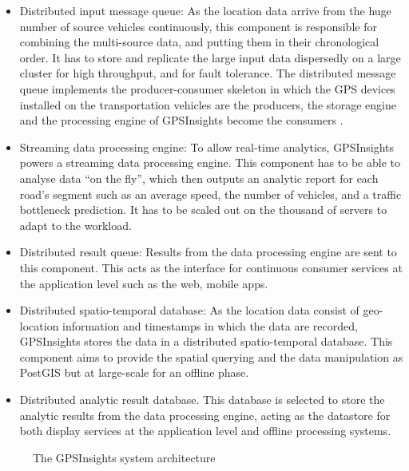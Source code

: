 \documentclass{sig-alternate-05-2015}
\begin{document}
\begin{itemize}
\item 	Distributed input message queue: As the location data arrive from the huge number of source vehicles continuously, this component is responsible for combining the multi-source data, and putting them in their chronological order. It has to store and replicate the large input data dispersedly on a large cluster for high throughput, and for fault tolerance. The distributed message queue implements the producer-consumer skeleton in which the GPS devices installed on the transportation vehicles are the producers, the storage engine and the processing engine of GPSInsights become the consumers	.

\item  Streaming data processing engine: To allow real-time analytics, GPSInsights powers a streaming data processing engine. This component has to be able to analyse data ``on the fly'', which then outputs an analytic report for each road's segment such as an average speed, the number of vehicles, and a traffic bottleneck prediction. It has to be scaled out on the thousand of servers to adapt to the workload.

\item  Distributed result queue: Results from the data processing engine are sent to this component. This acts as the interface for continuous consumer services at the application level such as the web, mobile apps. 

\item  Distributed spatio-temporal database: As the location data consist of geo-location information and timestamps in which the data are recorded, GPSInsights stores the data in a distributed spatio-temporal database. This component aims to provide the spatial querying and the data manipulation as PostGIS but at large-scale for an offline phase. 

\item  Distributed analytic result database. This database is selected to store the analytic results from the data processing engine, acting as the datastore for both display services at the application level and offline processing systems. 

\end{itemize}

\begin{figure}[h]
\centering
{}
\caption{The GPSInsights system architecture}
\label{architecture}
\end{figure}
\end{document}
